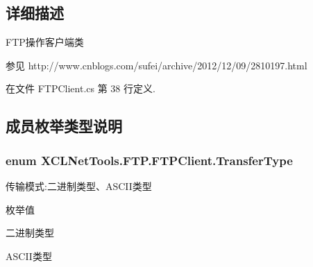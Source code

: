 \subsection{详细描述}
F\-T\-P操作客户端类 \begin{DoxySeeAlso}{参见}
http\-://www.\-cnblogs.\-com/sufei/archive/2012/12/09/2810197.\-html


\end{DoxySeeAlso}




在文件 F\-T\-P\-Client.\-cs 第 38 行定义.



\subsection{成员枚举类型说明}
\hypertarget{class_x_c_l_net_tools_1_1_f_t_p_1_1_f_t_p_client_adef28404af1c916d9bd2bfbfa924b707}{
\subsubsection[{Transfer\-Type}]{\setlength{\rightskip}{0pt plus 5cm}enum {\bf X\-C\-L\-Net\-Tools.\-F\-T\-P.\-F\-T\-P\-Client.\-Transfer\-Type}}}\label{class_x_c_l_net_tools_1_1_f_t_p_1_1_f_t_p_client_adef28404af1c916d9bd2bfbfa924b707}


传输模式\-:二进制类型、\-A\-S\-C\-I\-I类型 

\begin{Desc}
\item[枚举值]\par
\begin{description}
\item[{\em 
\hypertarget{class_x_c_l_net_tools_1_1_f_t_p_1_1_f_t_p_client_adef28404af1c916d9bd2bfbfa924b707a6ce976e8f061b2b5cfe4d0c50c3405dd}{Binary}\label{class_x_c_l_net_tools_1_1_f_t_p_1_1_f_t_p_client_adef28404af1c916d9bd2bfbfa924b707a6ce976e8f061b2b5cfe4d0c50c3405dd}
}]二进制类型 \item[{\em 
\hypertarget{class_x_c_l_net_tools_1_1_f_t_p_1_1_f_t_p_client_adef28404af1c916d9bd2bfbfa924b707ad2cd8253361a9c732d21ca1d336599cc}{A\-S\-C\-I\-I}\label{class_x_c_l_net_tools_1_1_f_t_p_1_1_f_t_p_client_adef28404af1c916d9bd2bfbfa924b707ad2cd8253361a9c732d21ca1d336599cc}
}]A\-S\-C\-I\-I类型 \end{description}
\end{Desc}


